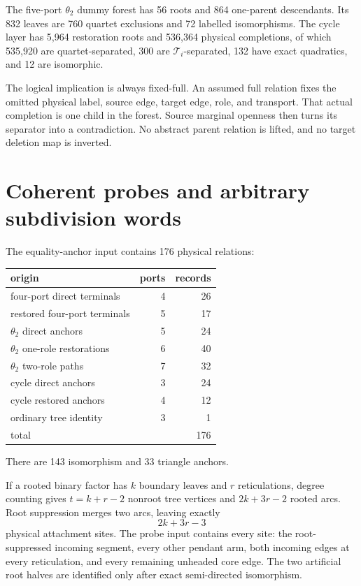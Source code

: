 \documentclass[11pt]{article}
\theoremstyle{remark}
\newcommand{\Ti}{\mathcal T_i}
\begin{document}
The five-port \(\theta_2\) dummy forest has 56 roots and 864 one-parent
descendants.  Its 832 leaves are 760 quartet exclusions and 72 labelled
isomorphisms.  The cycle layer has 5,964 restoration roots and 536,364
physical completions, of which 535,920 are quartet-separated, 300 are
\(\Ti\)-separated, 132 have exact quadratics, and 12 are isomorphic.

The logical implication is always fixed-full.  An assumed full relation fixes
the omitted physical label, source edge, target edge, role, and transport.
That actual completion is one child in the forest.  Source marginal openness
then turns its separator into a contradiction.  No abstract parent relation
is lifted, and no target deletion map is inverted.

\section{Coherent probes and arbitrary subdivision words}\label{sec:probes}

The equality-anchor input contains 176 physical relations:
\begin{center}
\begin{tabular}{lrr}
\toprule
origin & ports & records\\
\midrule
four-port direct terminals & 4 & 26\\
restored four-port terminals & 5 & 17\\
\(\theta_2\) direct anchors & 5 & 24\\
\(\theta_2\) one-role restorations & 6 & 40\\
\(\theta_2\) two-role paths & 7 & 32\\
cycle direct anchors & 3 & 24\\
cycle restored anchors & 4 & 12\\
ordinary tree identity & 3 & 1\\
\midrule
total & & 176
\end{tabular}
\end{center}
There are 143 isomorphism and 33 triangle anchors.

If a rooted binary factor has \(k\) boundary leaves and \(r\) reticulations,
degree counting gives \(t=k+r-2\) nonroot tree vertices and
\(2k+3r-2\) rooted arcs.  Root suppression merges two arcs, leaving exactly
\[
 2k+3r-3
\]
physical attachment sites.  The probe input contains every site: the
root-suppressed incoming segment, every other pendant arm, both incoming
edges at every reticulation, and every remaining unheaded core edge.  The two
artificial root halves are identified only after exact semi-directed
isomorphism.
\end{document}
